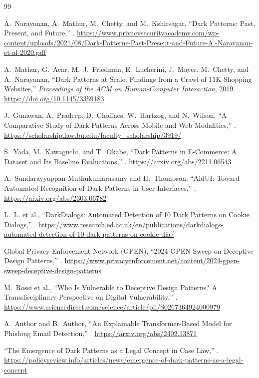 \clearpage
{}
\begin{thebibliography}{99}

A.~Narayanan, A.~Mathur, M.~Chetty, and M.~Kshirsagar,
\newblock ``Dark Patterns: Past, Present, and Future,''
.
\newblock \url{https://www.privacysecurityacademy.com/wp-content/uploads/2021/08/Dark-Patterns-Past-Present-and-Future-A.-Narayanan-et-al-2020.pdf}

A.~Mathur, G.~Acar, M.~J.~Friedman, E.~Lucherini, J.~Mayer, M.~Chetty, and A.~Narayanan,
\newblock ``Dark Patterns at Scale: Findings from a Crawl of 11K Shopping Websites,''
\newblock \emph{Proceedings of the ACM on Human-Computer Interaction}, 2019.
\newblock \url{https://doi.org/10.1145/3359183}

J.~Gunawan, A.~Pradeep, D.~Choffnes, W.~Hartzog, and N.~Wilson,
\newblock ``A Comparative Study of Dark Patterns Across Mobile and Web Modalities,''
.
\newblock \url{https://scholarship.law.bu.edu/faculty_scholarship/3919/}

S.~Yada, M.~Kawaguchi, and T.~Okabe,
\newblock ``Dark Patterns in E-Commerce: A Dataset and Its Baseline Evaluations,''
.
\newblock \url{https://arxiv.org/abs/2211.06543}

A.~Sundarayyappan Muthukumarasamy and H.~Thompson,
\newblock ``AidUI: Toward Automated Recognition of Dark Patterns in User Interfaces,''
.
\newblock \url{https://arxiv.org/abs/2303.06782}

L.~L. et al.,
\newblock ``DarkDialogs: Automated Detection of 10 Dark Patterns on Cookie Dialogs,''
.
\newblock \url{https://www.research.ed.ac.uk/en/publications/darkdialogs-automated-detection-of-10-dark-patterns-on-cookie-dia/}

Global Privacy Enforcement Network (GPEN),
\newblock ``2024 GPEN Sweep on Deceptive Design Patterns,''
.
\newblock \url{https://www.privacyenforcement.net/content/2024-gpen-sweep-deceptive-design-patterns}

M.~Rossi et al.,
\newblock ``Who Is Vulnerable to Deceptive Design Patterns? A Transdisciplinary Perspective on Digital Vulnerability,''
.
\newblock \url{https://www.sciencedirect.com/science/article/pii/S0267364924000979}

A.~Author and B.~Author,
\newblock ``An Explainable Transformer-Based Model for Phishing Email Detection,''
.
\newblock \url{https://arxiv.org/abs/2402.13871}

\newblock ``The Emergence of Dark Patterns as a Legal Concept in Case Law,''
.
\newblock \url{https://policyreview.info/articles/news/emergence-of-dark-patterns-as-a-legal-concept}

\end{thebibliography}
